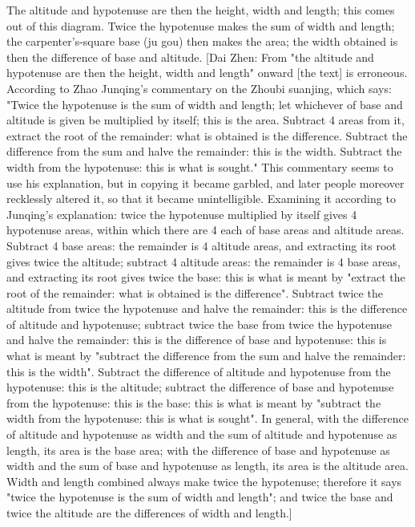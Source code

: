 \documentclass[11pt]{article}
\newenvironment{uniten}{\par\small\color{black!85}}{\par\medskip}
\begin{document}
\begin{uniten}The altitude and hypotenuse are then the height, width and length; this comes out of this diagram. Twice the hypotenuse makes the sum of width and length; the carpenter's-square base (ju gou) then makes the area; the width obtained is then the difference of base and altitude. [Dai Zhen: From "the altitude and hypotenuse are then the height, width and length" onward [the text] is erroneous. According to Zhao Junqing's commentary on the Zhoubi suanjing, which says: "Twice the hypotenuse is the sum of width and length; let whichever of base and altitude is given be multiplied by itself; this is the area. Subtract 4 areas from it, extract the root of the remainder: what is obtained is the difference. Subtract the difference from the sum and halve the remainder: this is the width. Subtract the width from the hypotenuse: this is what is sought." This commentary seems to use his explanation, but in copying it became garbled, and later people moreover recklessly altered it, so that it became unintelligible. Examining it according to Junqing's explanation: twice the hypotenuse multiplied by itself gives 4 hypotenuse areas, within which there are 4 each of base areas and altitude areas. Subtract 4 base areas: the remainder is 4 altitude areas, and extracting its root gives twice the altitude; subtract 4 altitude areas: the remainder is 4 base areas, and extracting its root gives twice the base: this is what is meant by "extract the root of the remainder: what is obtained is the difference". Subtract twice the altitude from twice the hypotenuse and halve the remainder: this is the difference of altitude and hypotenuse; subtract twice the base from twice the hypotenuse and halve the remainder: this is the difference of base and hypotenuse: this is what is meant by "subtract the difference from the sum and halve the remainder: this is the width". Subtract the difference of altitude and hypotenuse from the hypotenuse: this is the altitude; subtract the difference of base and hypotenuse from the hypotenuse: this is the base: this is what is meant by "subtract the width from the hypotenuse: this is what is sought". In general, with the difference of altitude and hypotenuse as width and the sum of altitude and hypotenuse as length, its area is the base area; with the difference of base and hypotenuse as width and the sum of base and hypotenuse as length, its area is the altitude area. Width and length combined always make twice the hypotenuse; therefore it says "twice the hypotenuse is the sum of width and length"; and twice the base and twice the altitude are the differences of width and length.]\end{uniten}
\end{document}
